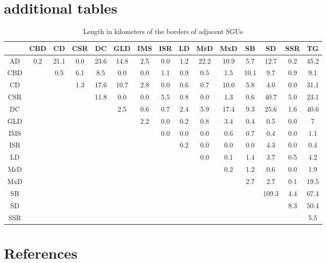 \documentclass[preprint,12pt,authoryear]{elsarticle}
\begin{document}
\section*{additional tables}
\begin{table}[ht]
\centering
\tabcolsep=0.06cm
\small
\begin{tabular}{ccccccccccccccc}
  \hline
 & CBD & CD & CSR & DC & GLD & IMS & ISR & LD  & MrD & MxD & SB & SD & SSR & TG \\ 
  \hline
AD & 0.2 & 21.1 & 0.0 & 23.6 & 14.8 & 2.5 & 0.0 & 1.2  & 22.2 & 10.9 & 5.7 & 12.7 & 0.2 & 45.2 \\ 
  CBD &  & 0.5 & 6.1 & 8.5 & 0.0 & 0.0 & 1.1 & 0.9  & 0.5 & 1.5 & 10.1 & 9.7 & 0.9 & 9.1 \\ 
  CD &  &  & 1.3 & 17.6 & 10.7 & 2.8 & 0.0 & 0.6  & 0.7 & 10.0 & 5.8 & 4.0 & 0.0 & 31.1\\ 
  CSR &  &  &  & 11.8 & 0.0 & 0.0 & 5.5 & 0.8  & 0.0 & 1.3 & 0.6 & 40.7 & 5.0 & 23.1 \\ 
  DC &  &  &  &  & 2.5 & 0.6 & 0.7 & 2.4  & 5.9 & 17.4 & 9.3 & 25.6 & 1.6 & 40.6 \\ 
  GLD &  &  &  &  &  & 2.2 & 0.0 & 0.2  & 0.8 & 3.4 & 0.4 & 0.5 & 0.0 & 7 \\ 
  IMS &  &  &  &  &  &  & 0.0 & 0.0  & 0.0 & 0.6 & 0.7 & 0.4 & 0.0 & 1.1 \\ 
  ISR &  &  &  &  &  &  &  & 0.2 & 0.0 & 0.0 & 0.0 & 4.3 & 0.0 & 0.4 \\ 
  LD &  &  &  &  &  &  &  &   & 0.0 & 0.1 & 1.4 & 3.7 & 0.5 & 4.2 \\ 
  MrD  &  &  &  &  &  &  &  &  &  & 0.2 & 1.2 & 0.6 & 0.0 & 1.9 \\ 
  MxD  &  &  &  &  &  &  &  &  &  &  & 2.7 & 2.7 & 0.1 & 19.5 \\ 
  SB  &  &  &  &  &  &  &  &  &  &  &  & 109.3 & 4.4 & 67.4\\ 
  SD  &  &  &  &  &  &  &  &  &  &  &  &  & 8.3 & 50.4 \\ 
  SSR  &  &  &  &  &  &  &  &  &  &  &  &  &  & 5.5 \\ 
   \hline
\end{tabular}
\caption{Length in kilometers of the borders of adjacent SGUs} 
\label{table:borderlength}
\end{table}
\section*{References}

\end{document}
